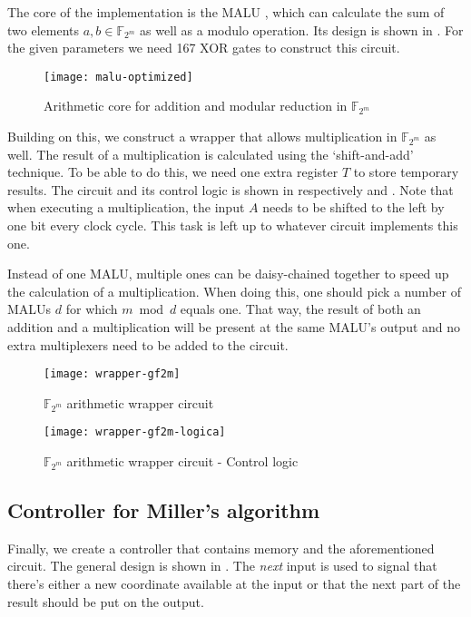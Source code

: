 The core of the implementation is the MALU \cite{sakiyama, batina-pkc}, which can calculate the sum of two elements $a, b \in \mathbb{F}_{2^m}$ as well as a modulo operation. Its design is shown in . For the given parameters we need 167 XOR gates to construct this circuit.

\begin{figure}[h]
	\centering
		\texttt{[image: malu-optimized]}
		\caption{Arithmetic core for addition and modular reduction in $\mathbb{F}_{2^m}$\label{figure-malu}}
\end{figure}

Building on this, we construct a wrapper that allows multiplication in $\mathbb{F}_{2^m}$ as well. The result of a multiplication is calculated using the `shift-and-add' technique. To be able to do this, we need one extra register $T$ to store temporary results. The circuit and its control logic is shown in respectively  and . Note that when executing a multiplication, the input $A$ needs to be shifted to the left by one bit every clock cycle. This task is left up to whatever circuit implements this one.

Instead of one MALU, multiple ones can be daisy-chained together to speed up the calculation of a multiplication. When doing this, one should pick a number of MALUs $d$ for which $m \bmod d$ equals one. That way, the result of both an addition and a multiplication will be present at the same MALU's output and no extra multiplexers need to be added to the circuit.

\begin{figure}[h]
	\centering
		\texttt{[image: wrapper-gf2m]}
		\caption{$\mathbb{F}_{2^m}$ arithmetic wrapper circuit\label{figure-gf2m}}
\end{figure}

\begin{figure}[h]
	\centering
		\texttt{[image: wrapper-gf2m-logica]}
		\caption{$\mathbb{F}_{2^m}$ arithmetic wrapper circuit - Control logic\label{figure-gf2m-logic}}
\end{figure}

\subsection{Controller for Miller's algorithm}

Finally, we create a controller that contains memory and the aforementioned circuit. The general design is shown in . The \emph{next} input is used to signal that there's either a new coordinate available at the input or that the next part of the result should be put on the output.


